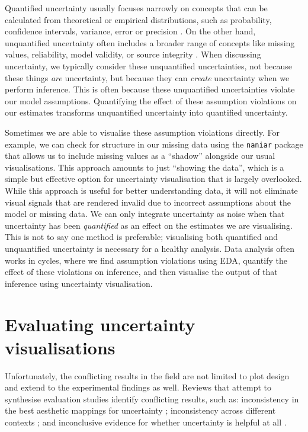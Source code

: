 \documentclass[]{ar-1col-S2O}
\begin{document}
Quantified uncertainty usually focuses narrowly on concepts that can be
calculated from theoretical or empirical distributions, such as
probability, confidence intervals, variance, error or precision
\citep{Hullman2018, Maceachren2012, Thomson2005, Kay2023}. On the other
hand, unquantified uncertainty often includes a broader range of
concepts like missing values, reliability, model validity, or source
integrity
\citep{Griethe2006, Leland2005, Pang1997, Pham2009, Boukhelifa2017}.
When discussing uncertainty, we typically consider these unquantified
uncertainties, not because these things \emph{are} uncertainty, but
because they can \emph{create} uncertainty when we perform inference.
This is often because these unquantified uncertainties violate our model
assumptions. Quantifying the effect of these assumption violations on
our estimates transforms unquantified uncertainty into quantified
uncertainty.

Sometimes we are able to visualise these assumption violations directly.
For example, we can check for structure in our missing data using the
\texttt{naniar} package \citet{Tierney2023} that allows us to include
missing values as a ``shadow'' alongside our usual visualisations. This
approach amounts to just ``showing the data'', which is a simple but
effective option for uncertainty visualisation that is largely
overlooked. While this approach is useful for better understanding data,
it will not eliminate visual signals that are rendered invalid due to
incorrect assumptions about the model or missing data. We can only
integrate uncertainty as noise when that uncertainty has been
\emph{quantified} as an effect on the estimates we are visualising. This
is not to say one method is preferable; visualising both quantified and
unquantified uncertainty is necessary for a healthy analysis. Data
analysis often works in cycles, where we find assumption violations
using EDA, quantify the effect of these violations on inference, and
then visualise the output of that inference using uncertainty
visualisation.

\section{Evaluating uncertainty
visualisations}\label{evaluating-uncertainty-visualisations}

Unfortunately, the conflicting results in the field are not limited to
plot design and extend to the experimental findings as well. Reviews
that attempt to synthesise evaluation studies identify conflicting
results, such as: inconsistency in the best aesthetic mappings for
uncertainty \citep{Kinkeldey2014, MacEachren2005}; inconsistency across
different contexts \citep{Kinkeldey2014, Hullman2016}; and inconclusive
evidence for whether uncertainty is helpful at all
\citep{MacEachren2005}.
\end{document}
